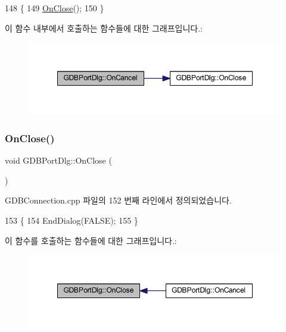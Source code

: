 \begin{DoxyCode}
148 \{
149   \mbox{\hyperlink{class_g_d_b_port_dlg_a77f1b200ffbe8a3d0cc555baec9c36ce}{OnClose}}();
150 \}
\end{DoxyCode}
이 함수 내부에서 호출하는 함수들에 대한 그래프입니다.\+:
\nopagebreak
\begin{figure}[H]
\begin{center}
\leavevmode
\includegraphics[width=348pt]{class_g_d_b_port_dlg_aec825d9c81585a57a4951fe68940293d_cgraph}
\end{center}
\end{figure}
\mbox{\label{class_g_d_b_port_dlg_a77f1b200ffbe8a3d0cc555baec9c36ce}} 
\subsubsection{\texorpdfstring{On\+Close()}{OnClose()}}
{\footnotesize\ttfamily void G\+D\+B\+Port\+Dlg\+::\+On\+Close (\begin{DoxyParamCaption}{ }\end{DoxyParamCaption})\hspace{0.3cm}{\ttfamily [protected]}}



G\+D\+B\+Connection.\+cpp 파일의 152 번째 라인에서 정의되었습니다.


\begin{DoxyCode}
153 \{
154   EndDialog(FALSE);
155 \}
\end{DoxyCode}
이 함수를 호출하는 함수들에 대한 그래프입니다.\+:
\nopagebreak
\begin{figure}[H]
\begin{center}
\leavevmode
\includegraphics[width=348pt]{class_g_d_b_port_dlg_a77f1b200ffbe8a3d0cc555baec9c36ce_icgraph}
\end{center}
\end{figure}
\mbox{\label{class_g_d_b_port_dlg_af7abe221ad56b1aedf9f3dad6e03a031}} 
